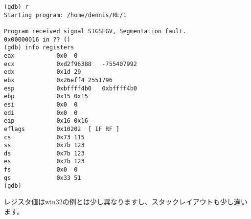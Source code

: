 \begin{lstlisting}
(gdb) r
Starting program: /home/dennis/RE/1 

Program received signal SIGSEGV, Segmentation fault.
0x00000016 in ?? ()
(gdb) info registers
eax            0x0	0
ecx            0xd2f96388	-755407992
edx            0x1d	29
ebx            0x26eff4	2551796
esp            0xbffff4b0	0xbffff4b0
ebp            0x15	0x15
esi            0x0	0
edi            0x0	0
eip            0x16	0x16
eflags         0x10202	[ IF RF ]
cs             0x73	115
ss             0x7b	123
ds             0x7b	123
es             0x7b	123
fs             0x0	0
gs             0x33	51
(gdb) 
\end{lstlisting}

レジスタ値はwin32の例とは少し異なりますし、スタックレイアウトも少し違います。
